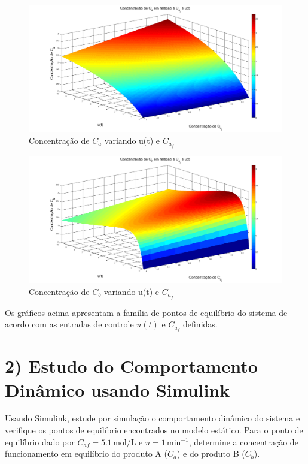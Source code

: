 \documentclass[a4paper,12pt]{report}
\begin{document}
 \begin{figure}[H]
  \centering
  \includegraphics[width=1\textwidth]{Imagens/CAFxUxCA.png}
  \caption{Concentração de \( C_a \) variando u(t) e \( C_{a_f} \)}
  \end{figure}

   \begin{figure}[H]
  \centering
  \includegraphics[width=1\textwidth]{Imagens/CAFxUxCB.png}
  \caption{Concentração de \( C_b \) variando u(t) e \( C_{a_f} \)}
  \end{figure}

  Os gráficos acima apresentam a família de pontos de equilíbrio do sistema de acordo com as entradas de controle \(u(t)\) e \(C_{a_f}\) definidas.
  
\newpage





\section{2) Estudo do Comportamento Dinâmico usando Simulink}

Usando Simulink, estude por simulação o comportamento dinâmico do sistema e verifique os pontos de equilíbrio encontrados no modelo estático. Para o ponto de equilíbrio dado por \( C_{af} = 5.1 \, \text{mol/L} \) e \( u = 1 \, \text{min}^{-1} \), determine a concentração de funcionamento em equilíbrio do produto A (\( C_a \)) e do produto B (\( C_b \)).
\end{document}
